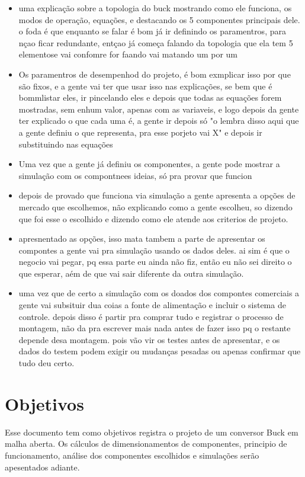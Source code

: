 \documentclass[12pt, a4paper]{article}
\begin{document}
\begin{itemize}
    
\item uma explicação sobre a topologia do buck mostrando como ele funciona, os modos de operação, equações, e destacando os 5 componentes principais dele. o foda é que enquanto se falar é bom já ir definindo os paramentros, para nçao ficar redundante, entçao já começa falando da topologia que ela tem 5 elementose vai confomre for faando vai matando um por um
\item Os paramentros de desempenhod do projeto, é bom exmplicar isso por que são fixos, e a gente vai ter que usar isso nas explicações, se bem que é bommlistar eles, ir pincelando eles e depois que todas as equações forem mostradas, sem enhum valor, apenas com as variaveis, e logo depois da gente ter explicado o que cada uma é, a gente ir depois só "o lembra disso aqui que a gente definiu o que representa, pra esse porjeto vai X" e depois ir substituindo nas equações
\item Uma vez que a gente já definiu os componentes, a gente pode mostrar a simulação com os compontnees ideias, só pra provar que funcion
\item depois de provado que funciona via simulação a gente apresenta a opções de mercado que escolhemos, não explicando como a gente escolheu, so dizendo que foi esse o escolhido e dizendo como ele atende aos criterios de projeto.
\item apresnentado as opções, isso mata tambem a parte de apresentar os compontes a gente vai pra simulação usando os dados deles. ai sim é que o negocio vai pegar, pq essa parte eu ainda não fiz, então eu não sei direito o que esperar, aém de que vai sair diferente da outra simulação.
\item uma vez que de certo a simulação com os doados dos compontes comerciais a gente vai subsituir dua coias a fonte de alimentação e incluir o sistema de controle. depois disso é partir pra comprar tudo e registrar o processo de montagem, não da pra escrever mais nada antes de fazer isso pq o restante depende desa montagem. pois vão vir os testes antes de apresentar, e os dados do testem podem exigir ou mudanças pesadas ou apenas confirmar que tudo deu certo.
\end{itemize}


\section{Objetivos}

Esse documento tem como objetivos registra o projeto de um conversor Buck em malha aberta. Os cálculos de dimensionamentos de componentes, principio de funcionamento, análise dos componentes escolhidos e simulações serão apesentados adiante.






\end{document}
